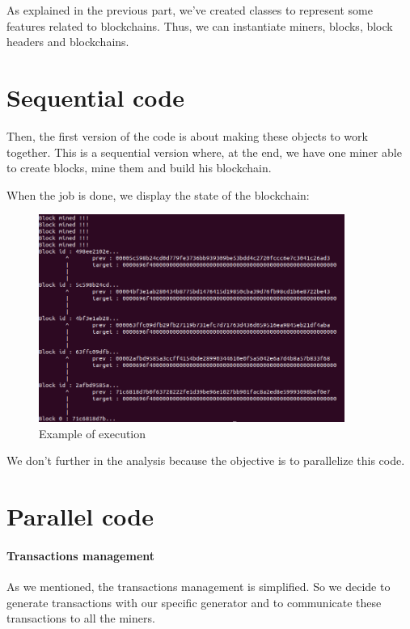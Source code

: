 As explained in the previous part, we've created classes to represent some features related to blockchains. Thus, we can instantiate miners, blocks, block headers and blockchains.

\section{Sequential code}

Then, the first version of the code is about making these objects to work together. This is a sequential version where, at the end, we have one miner able to create blocks, mine them and build his blockchain.

When the job is done, we display the state of the blockchain: \newline

\begin{figure}[ht]
\centering
\includegraphics[width=10cm]{Figures/sequentialCode}
\caption{Example of execution}
\end{figure}
\medskip

We don't further in the analysis because the objective is to parallelize this code.

\section{Parallel code}

\paragraph{Transactions management}

As we mentioned, the transactions management is simplified. So we decide to generate transactions with our specific generator and to communicate these transactions to all the miners. \newline

